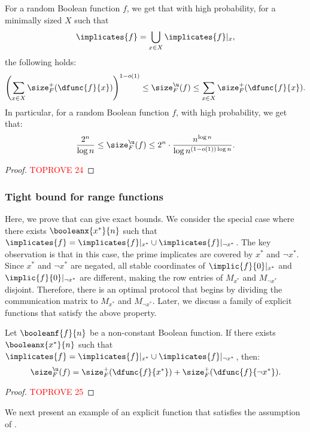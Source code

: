 \documentclass[acmsmall, nonacm, authorversion]{acmart}
\begin{document}
\begin{theorem}
    \label{thm:ub-tight}
For a random Boolean function $f$, we get that with high probability, for a minimally sized $X$ such that 
\[
\implicates{f}=\bigcup_{x\in X}\implicates{f}|_x,
\]
the following holds:
\[
\left(\sum_{x\in X}\size_{F}^{+}(\dfunc{f}{x})\right)^{1-o(1)}\leq \size_{F}^\u(f)\le \sum_{x\in X}\size_{F}^{+}(\dfunc{f}{x}).
\]
In particular, for a random Boolean function $f$, with high probability, we get that:
\[
\frac{2^n}{\log n}\leq \size_{F}^\u(f)  \leq 2^n\cdot \frac{n^{\log n}}{\log n ^{(1-o(1))\log n}}.
\]
\end{theorem}
\begin{proof}\textcolor{red}{TOPROVE 24}\end{proof}

\subsubsection{Tight bound for range functions}\label{subsection:tight-lower-bound-range}
Here, we prove that  can give exact bounds. We consider the special case where there exists $\booleanx{x^*}{n}$ such that $\implicates{f}=\implicates{f}|_{x^*}\cup \implicates{f}|_{\neg x^*}$. The key observation is that in this case, the prime implicates are covered by $x^*$ and $\neg x^*$. Since $x^*$ and $\neg x^*$ are negated, all stable coordinates of $\implic{f}{0}|_{x^*}$ and $\implic{f}{0}|_{\neg x^*}$ are different, making the row entries of $M_{x^*}$ and $M_{\neg x^*}$ disjoint. Therefore, there is an optimal protocol that begins by dividing the communication matrix to $M_{x^*}$ and $M_{\neg x^*}$.
Later, we discuss a family of explicit functions that satisfy the above property.

\begin{proposition}\label{prop:lower-bound-partition-x}
Let $\booleanf{f}{n}$ be a non-constant Boolean function. If there exists $\booleanx{x^*}{n}$ such that $\implicates{f}=\implicates{f}|_{x^*}\cup \implicates{f}|_{\neg x^*}$, then:
\[
\size_{F}^\u(f)=\size_{F}^+(\dfunc{f}{x^*})+\size_{F}^+(\dfunc{f}{\neg x^*}).
\]
\end{proposition}
\begin{proof}\textcolor{red}{TOPROVE 25}\end{proof}

We next present an example of an explicit function that satisfies the assumption of .
\end{document}
